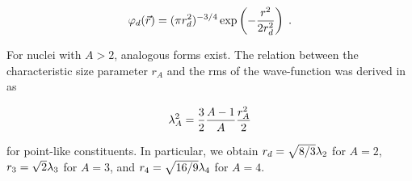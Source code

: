 \begin{equation}\label{eq:WaveHeinz}
 \varphi_{d}(\vec{r}) = (\pi r_{d}^2)^{-3/4} \exp\left(-{r^2 \over 2 r_{d}^2}\right) \;.
\end{equation}

\noindent For nuclei with $A > 2$, analogous forms exist. The relation between the characteristic size parameter $r_{A}$ and the rms of the wave-function was derived in~\cite{Shebeko:2006ud} as


\begin{equation}
 \lambda_{A}^2 = {3 \over 2}{A - 1 \over A} {r_{A}^2 \over 2}
\end{equation} 

\noindent for point-like constituents. In particular, we obtain $r_{d}= \sqrt{8/3}  \lambda_{2}$ for $A = 2$, $r_{3}= \sqrt{2}{\lambda_{3}}$ for $A = 3$, and  $r_{4}= \sqrt{16/9} \lambda_{4}$ for $A=4$.%

